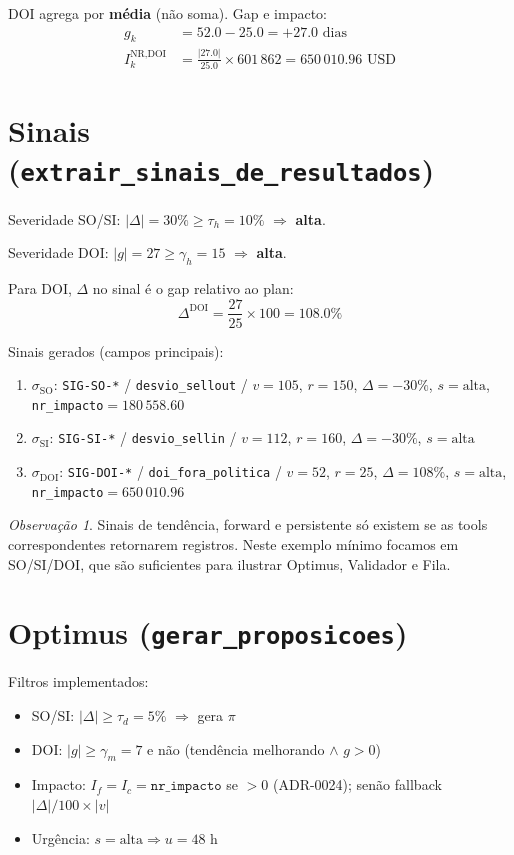 \documentclass[a4paper, 12pt]{report}
\theoremstyle{definition}
\theoremstyle{remark}
\newtheorem{observacao}{Observa\c{c}\~ao}[chapter]
\begin{document}
DOI agrega por \textbf{m\'edia} (n\~ao soma). Gap e impacto:
\begin{align*}
  g_k
    &= 52.0 - 25.0 = +27.0 \text{ dias} \\
  I^{\text{NR,DOI}}_k
    &= \frac{|27.0|}{25.0} \times 601\,862
     = 650\,010.96 \text{ USD}
\end{align*}


\section{Sinais (\texttt{extrair\_sinais\_de\_resultados})}

Severidade SO/SI: $|\Delta| = 30\% \geq \tau_h = 10\%$ $\Rightarrow$ \textbf{alta}.

Severidade DOI: $|g| = 27 \geq \gamma_h = 15$ $\Rightarrow$ \textbf{alta}.

Para DOI, $\Delta$ no sinal \'e o gap relativo ao plan:
\[
  \Delta^{\text{DOI}} = \frac{27}{25} \times 100 = 108.0\%
\]

Sinais gerados (campos principais):

\begin{enumerate}
  \item $\sigma_{\text{SO}}$:
    \texttt{SIG-SO-*} / \texttt{desvio\_sellout} /
    $v=105$, $r=150$, $\Delta=-30\%$, $s=\text{alta}$,
    \texttt{nr\_impacto}$=180\,558.60$
  \item $\sigma_{\text{SI}}$:
    \texttt{SIG-SI-*} / \texttt{desvio\_sellin} /
    $v=112$, $r=160$, $\Delta=-30\%$, $s=\text{alta}$
  \item $\sigma_{\text{DOI}}$:
    \texttt{SIG-DOI-*} / \texttt{doi\_fora\_politica} /
    $v=52$, $r=25$, $\Delta=108\%$, $s=\text{alta}$,
    \texttt{nr\_impacto}$=650\,010.96$
\end{enumerate}

\begin{observacao}
  Sinais de tend\^encia, forward e persistente s\'o existem se as tools
  correspondentes retornarem registros. Neste exemplo m\'inimo focamos
  em SO/SI/DOI, que s\~ao suficientes para ilustrar Optimus, Validador
  e Fila.
\end{observacao}


\section{Optimus (\texttt{gerar\_proposicoes})}

Filtros implementados:
\begin{itemize}
  \item SO/SI: $|\Delta| \geq \tau_d = 5\%$ $\Rightarrow$ gera $\pi$
  \item DOI: $|g| \geq \gamma_m = 7$ e n\~ao (tend\^encia melhorando $\land$ $g>0$)
  \item Impacto: $I_f = I_c = \texttt{nr\_impacto}$ se $> 0$
    (ADR-0024); sen\~ao fallback $|\Delta|/100 \times |v|$
  \item Urg\^encia: $s=\text{alta} \Rightarrow u=48$ h
\end{itemize}
\end{document}
